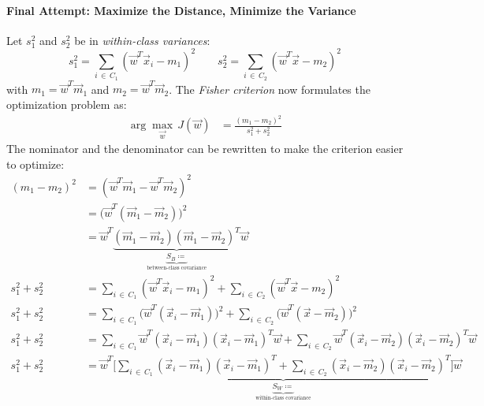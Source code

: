 			\paragraph{Final Attempt: Maximize the Distance, Minimize the Variance}
				Let \( s_1^2 \) and \( s_2^2 \) be in \emph{within-class variances}:
				\begin{equation}
					s_1^2 = \sum_{i \,\in\, C_1} (\vec{w}^T \vec{x}_i - m_1)^2 \qquad s_2^2 = \sum_{i \,\in\, C_2} (\vec{w}^T \vec{x} - m_2)^2
				\end{equation}
				with \( m_1 = \vec{w}^T \vec{m}_1 \) and \( m_2 = \vec{w}^T \vec{m}_2 \). The \emph{Fisher criterion} now formulates the optimization problem as:
				\begin{align}
					\arg\max\limits_{\vec{w}} \, J(\vec{w}) & = \frac{(m_1 - m_2)^2}{s_1^2 + s_2^2}
				\end{align}
				The nominator and the denominator can be rewritten to make the criterion easier to optimize:
				\begin{align}
					(m_1 - m_2)^2 & = (\vec{w}^T \vec{m}_1 - \vec{w}^T \vec{m}_2)^2                                                                                                                                                                                                                \\
					              & = \big(\vec{w}^T (\vec{m}_1 - \vec{m}_2)\big)^2                                                                                                                                                                                                                \\
					              & = \vec{w}^T \underbrace{(\vec{m}_1 - \vec{m}_2) (\vec{m}_1 - \vec{m}_2)^T}_{\underbrace{S_B \coloneqq}_{\textrm{between-class covariance}}} \vec{w}                                                                                                            \\
					s_1^2 + s_2^2 & = \sum_{i \,\in\, C_1} (\vec{w}^T \vec{x}_i - m_1)^2 + \sum_{i \,\in\, C_2} (\vec{w}^T \vec{x} - m_2)^2                                                                                                                                                        \\
					s_1^2 + s_2^2 & = \sum_{i \,\in\, C_1} \big(\vec{w}^T (\vec{x}_i - \vec{m}_1)\big)^2 + \sum_{i \,\in\, C_2} \big(\vec{w}^T (\vec{x} - \vec{m}_2)\big)^2                                                                                                                        \\
					s_1^2 + s_2^2 & = \sum_{i \,\in\, C_1} \vec{w}^T (\vec{x}_i - \vec{m}_1) (\vec{x}_i - \vec{m}_1)^T \vec{w} + \sum_{i \,\in\, C_2} \vec{w}^T (\vec{x}_i - \vec{m}_2) (\vec{x}_i - \vec{m}_2)^T \vec{w}                                                                          \\
					s_1^2 + s_2^2 & = \vec{w}^T \underbrace{\Bigg[ \sum_{i \,\in\, C_1} (\vec{x}_i - \vec{m}_1) (\vec{x}_i - \vec{m}_1)^T + \sum_{i \,\in\, C_2} (\vec{x}_i - \vec{m}_2) (\vec{x}_i - \vec{m}_2)^T \Bigg]}_{\underbrace{S_W \coloneqq}_{\textrm{within-class covariance}}} \vec{w}
				\end{align}
